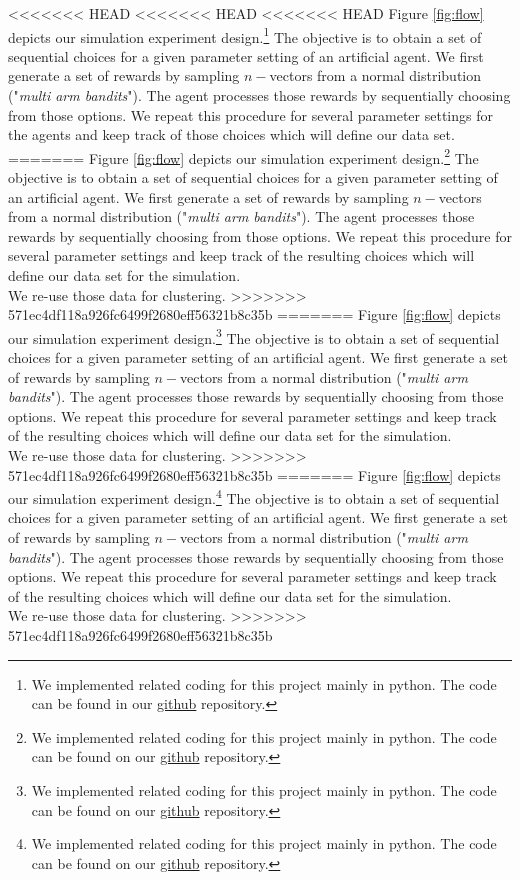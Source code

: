 \documentclass[12pt,a4paper,bibliography=totocnumbered,listof=totocnumbered]{scrartcl}
\begin{document}
<<<<<<< HEAD
<<<<<<< HEAD
<<<<<<< HEAD
Figure \ref{fig:flow} depicts our simulation experiment design.\footnote{We implemented related coding for this project mainly in python. The code can be found in our  \href{https://github.com/FelixGSE/Master-Project}{github} repository.} The objective is to obtain a set of sequential choices for a given parameter setting of an artificial agent. We first generate a set of rewards by sampling $n-$vectors from a normal distribution ("\textit{multi arm bandits}"). The agent processes those rewards by sequentially choosing from those options. We repeat this procedure for several parameter settings for the agents and keep track of those choices which will define our data set.
=======
Figure \ref{fig:flow} depicts our simulation experiment design.\footnote{We implemented related coding for this project mainly in python. The code can be found on our  \href{https://github.com/FelixGSE/Master-Project}{github} repository.} The objective is to obtain a set of sequential choices for a given parameter setting of an artificial agent. We first generate a set of rewards by sampling $n-$vectors from a normal distribution ("\textit{multi arm bandits}"). The agent processes those rewards by sequentially choosing from those options. We repeat this procedure for several parameter settings and keep track of the resulting choices which will define our data set for the simulation.\\
We re-use those data for clustering. 
>>>>>>> 571ec4df118a926fc6499f2680eff56321b8c35b
=======
Figure \ref{fig:flow} depicts our simulation experiment design.\footnote{We implemented related coding for this project mainly in python. The code can be found on our  \href{https://github.com/FelixGSE/Master-Project}{github} repository.} The objective is to obtain a set of sequential choices for a given parameter setting of an artificial agent. We first generate a set of rewards by sampling $n-$vectors from a normal distribution ("\textit{multi arm bandits}"). The agent processes those rewards by sequentially choosing from those options. We repeat this procedure for several parameter settings and keep track of the resulting choices which will define our data set for the simulation.\\
We re-use those data for clustering. 
>>>>>>> 571ec4df118a926fc6499f2680eff56321b8c35b
=======
Figure \ref{fig:flow} depicts our simulation experiment design.\footnote{We implemented related coding for this project mainly in python. The code can be found on our  \href{https://github.com/FelixGSE/Master-Project}{github} repository.} The objective is to obtain a set of sequential choices for a given parameter setting of an artificial agent. We first generate a set of rewards by sampling $n-$vectors from a normal distribution ("\textit{multi arm bandits}"). The agent processes those rewards by sequentially choosing from those options. We repeat this procedure for several parameter settings and keep track of the resulting choices which will define our data set for the simulation.\\
We re-use those data for clustering. 
>>>>>>> 571ec4df118a926fc6499f2680eff56321b8c35b
\end{document}
